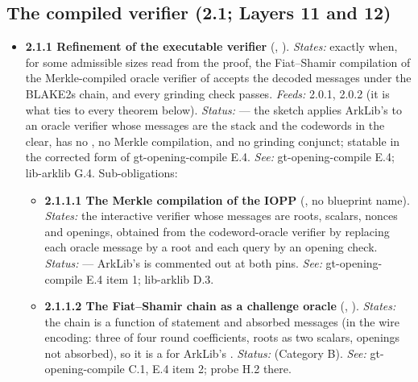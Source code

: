 \begin{itemize}[label={}, leftmargin=1.3em, itemindent=-1.3em, labelwidth=0pt, labelsep=0pt, itemsep=4pt, topsep=3pt]
\end{itemize}

\subsection[The compiled verifier (2.1)]{The compiled verifier (2.1; Layers 11 and 12)}\label{sec:obl-tier-compiled}

\begin{itemize}[label={}, leftmargin=1.3em, itemindent=-1.3em, labelwidth=0pt, labelsep=0pt, itemsep=4pt, topsep=3pt]
\item {}\label{obl:node-2.1.1}\oblflag\textbf{2.1.1 Refinement of the executable verifier} (, ). \emph{States:}  exactly when, for some admissible sizes  read from the proof, the Fiat–Shamir compilation of the Merkle-compiled oracle verifier of  accepts the decoded messages under the BLAKE2s chain, and every grinding check passes. \emph{Feeds:} 2.0.1, 2.0.2 (it is what ties  to every theorem below). \emph{Status:}   — the sketch applies ArkLib's  to an oracle verifier whose messages are the stack and the codewords in the clear, has no , no Merkle compilation, and no grinding conjunct; statable in the corrected form of gt-opening-compile E.4. \emph{See:} gt-opening-compile E.4; lib-arklib G.4. Sub-obligations:
\begin{itemize}[label={}, leftmargin=1.3em, itemindent=-1.3em, labelwidth=0pt, labelsep=0pt, itemsep=4pt, topsep=3pt]
\item {}\label{obl:node-2.1.1.1}\oblflag\textbf{2.1.1.1 The Merkle compilation of the IOPP} (, no blueprint name). \emph{States:} the interactive verifier whose messages are roots, scalars, nonces and openings, obtained from the codeword-oracle verifier by replacing each oracle message by a root and each query by an opening check. \emph{Status:}   — ArkLib's  is commented out at both pins. \emph{See:} gt-opening-compile E.4 item 1; lib-arklib D.3.
\item {}\label{obl:node-2.1.1.2}\textbf{2.1.1.2 The Fiat–Shamir chain as a challenge oracle} (, ). \emph{States:} the chain is a function of statement and absorbed messages (in the wire encoding: three of four round coefficients, roots as two scalars, openings not absorbed), so it is a  for ArkLib's . \emph{Status:}  (Category B). \emph{See:} gt-opening-compile C.1, E.4 item 2; probe H.2 there.

\end{itemize}
\end{itemize}

